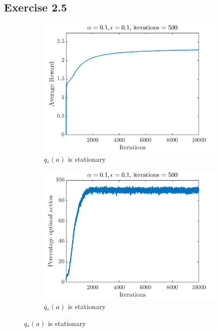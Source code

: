\documentclass[10pt]{article}
\begin{document}
	\subsection*{Exercise 2.5}
	\label{ss:2.5}
	\begin{figure}[H]
		\begin{subfigure}{0.45\textwidth}
			\includegraphics[width=\linewidth]{ex_2_5_fig_1a}
			\caption{$q_{*}(a)$ is stationary}
		\end{subfigure}
		\begin{subfigure}{0.45\textwidth}
			\includegraphics[width=\linewidth]{ex_2_5_fig_1b}
			\caption{$q_{*}(a)$ is stationary}
			\label{f1}
		\end{subfigure}

\end{figure}
\end{document}
